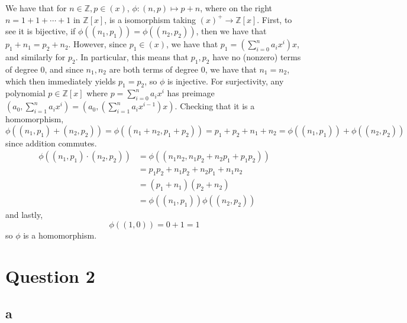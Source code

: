 \documentclass[12pt,letterpaper]{article}
\theoremstyle{definition}
\newcommand{\Z}{\mathbb{Z}}
\begin{document}
We have that for $n \in \Z, p \in (x)$, $\phi: (n, p) \mapsto p + n$, where on the right $n = 1 + 1 + \cdots + 1$ in $\Z[x]$, is a isomorphism taking $(x)^{+} \rightarrow \Z[x]$. First, to see it is bijective, if $\phi((n_{1}, p_{1})) = \phi((n_{2}, p_{2}))$, then we have that $p_{1} + n_{1} = p_{2} + n_{2}$. However, since $p_{1} \in (x)$, we have that $p_{1} = \left(\sum_{i=0}^{n}a_{i}x^{i}\right)x$, and similarly for $p_{2}$. In particular, this means that $p_{1}, p_{2}$ have no (nonzero) terms of degree $0$, and since $n_{1}, n_{2}$ are both terms of degree 0, we have that $n_{1} = n_{2}$, which then immediately yields $p_{1} = p_{2}$, so $\phi$ is injective. For surjectivity, any polynomial $p \in \Z[x]$ where $p = \sum_{i=0}^{n}a_{i}x^{i}$ has preimage $(a_{0}, \sum_{i=1}^{n}a_{i}x^{i}) = (a_{0}, (\sum_{i=1}^{n}a_{i}x^{i-1})x)$. Checking that it is a homomorphism,
\[
  \phi((n_{1}, p_{1}) + (n_{2}, p_{2})) = \phi((n_{1} + n_{2}, p_{1}+  p_{2})) = p_{1} + p_{2} + n_{1} + n_{2} = \phi((n_{1}, p_{1})) + \phi((n_{2}, p_{2}))
\]
since addition commutes.
\begin{align*}
  \phi((n_{1}, p_{1}) \cdot (n_{2}, p_{2})) &= \phi((n_{1}n_{2}, n_{1}p_{2} + n_{2}p_{1} + p_{1}p_{2})) \\
                                            &= p_{1}p_{2} + n_{1}p_{2} + n_{2}p_{1} + n_{1}n_{2} \\
                                            &= (p_{1} + n_{1})(p_{2} + n_{2}) \\
                                            &= \phi((n_{1}, p_{1}))\phi((n_{2}, p_{2}))
\end{align*}
and lastly,
\[
  \phi((1, 0)) = 0 + 1 = 1
\]
so $\phi$ is a homomorphism.

\section*{Question 2}

\subsection*{a}
\end{document}
